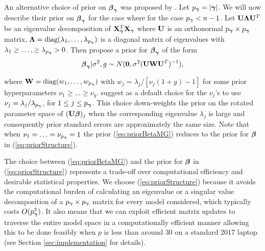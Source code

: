 An alternative choice of prior on ${\boldsymbol \beta}_{\boldsymbol \gamma}$ was proposed by \cite{Maruyama2011}. Let
$p_{{\boldsymbol \gamma}} = |{\boldsymbol \gamma}|$. We will now describe their prior on ${\boldsymbol \beta}_{\boldsymbol \gamma}$ for the case where for the case
$p_{{\boldsymbol \gamma}} < n - 1$. Let ${\bf U}{\boldsymbol \Lambda}{\bf U}^T$ be an eigenvalue decomposition of ${\bf X}_{\boldsymbol \gamma}^T{\bf X}_{\boldsymbol \gamma}$
where ${\bf U}$ is an orthonormal $p_{{\boldsymbol \gamma}} \times p_{{\boldsymbol \gamma}}$ matrix, ${\boldsymbol \Lambda} = \mbox{diag}(\lambda_1,\ldots,\lambda_{p_{{\boldsymbol \gamma}}})$ 
is a diagonal matrix of eigenvalues with $\lambda_1\ge\ldots,\ge \lambda_{p_{{\boldsymbol \gamma}}}>0$. Then \cite{Maruyama2011} 
propose a prior for ${\boldsymbol \beta}_{\boldsymbol \gamma}$ of the form
\begin{equation}
\label{eq:priorBetaMG}
{\boldsymbol\beta}_{\boldsymbol \gamma} | \sigma^2, g \sim N({\bf 0}, \sigma^2 ({\bf U}{\bf W}{\bf U}^T)^{-1}),   
\end{equation} 

\noindent where ${\bf W} = \mbox{diag}(w_1,\ldots,w_{p_{{\boldsymbol \gamma}}})$ with $ w_j = \lambda_j/[\nu_j(1 + g) - 1]$ for 
some prior hyperparameters $\nu_1 \ge \ldots \ge \nu_q$. \cite{Maruyama2011} suggest as a default 
choice for the $\nu_j$'s to use $\nu_j = \lambda_j/\lambda_{p_{{\boldsymbol \gamma}}}$, for $1\le j \le p_{{\boldsymbol \gamma}}$. 
This choice down-weights the prior on the rotated parameter space of $({\bf U} {\boldsymbol \beta})_j$ when the 
corresponding eigenvalue $\lambda_j$ is large and consequently prior standard errors are 
approximately the same size. Note that when $\nu_1 = \ldots = \nu_{p_{{\boldsymbol \gamma}}} = 1$ the prior 
(\ref{eq:priorBetaMG}) reduces to the prior for ${\boldsymbol \beta}$ in (\ref{eq:priorStructure}). 

The choice between (\ref{eq:priorBetaMG}) and the prior for ${\boldsymbol \beta}$ in (\ref{eq:priorStructure}) 
represents a trade-off over computational efficiency and desirable statistical properties. We choose
(\ref{eq:priorStructure}) because it avoids the computational burden of calculating an eigenvalue or a singular 
value decomposition of a $p_{{\boldsymbol \gamma}}\times p_{{\boldsymbol \gamma}}$ matrix for every model considered,
which typically costs $O(p_{{\boldsymbol \gamma}}^3)$. 
It also means that we can 
exploit efficient matrix updates to traverse the entire model space in a computationally efficient 
manner allowing this to be done feasibly when $p$ is less than around 30 on a standard 2017 laptop 
(see Section \ref{sec:implementation} for details).


